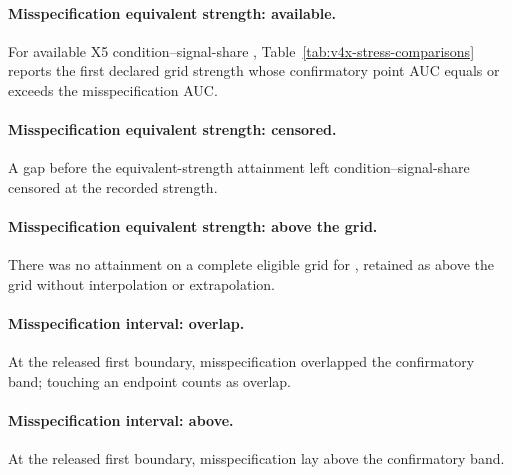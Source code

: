 \paragraph{Misspecification equivalent strength: available.}
For  available X5 condition--signal-share , Table~\ref{tab:v4x-stress-comparisons} reports the first declared grid strength whose confirmatory point AUC equals or exceeds the misspecification AUC.

\paragraph{Misspecification equivalent strength: censored.}
A gap before the equivalent-strength attainment left  condition--signal-share  censored at the recorded strength.

\paragraph{Misspecification equivalent strength: above the grid.}
There was no attainment on a complete eligible grid for  , retained as above the grid without interpolation or extrapolation.

\paragraph{Misspecification interval: overlap.}
At the released first boundary,  misspecification  overlapped the confirmatory band; touching an endpoint counts as overlap.

\paragraph{Misspecification interval: above.}
At the released first boundary,  misspecification  lay above the confirmatory band.

